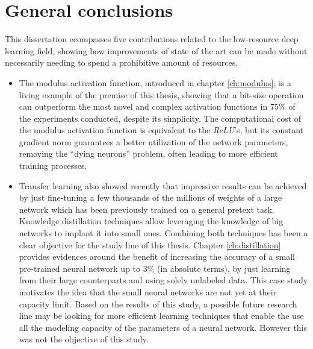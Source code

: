 \chapter{General conclusions} \label{ch:conclusions}
This dissertation ecompasses five contributions related to the low-resource deep learning field, showing how improvements of state of the art can be made without necessarily needing to spend a prohibitive amount of resources. 

\begin{itemize}
\item The modulus activation function, introduced in chapter \ref{ch:modulus}, is a living example of the premise of this thesis, showing that a bit-size operation can outperform the most novel and complex activation functions in 75\% of the experiments conducted, despite its simplicity. The computational cost of the modulus activation function is equivalent to the \textit{ReLU}'s, but its constant gradient norm guarantees a better utilization of the network parameters, removing the ``dying neurons'' problem, often leading to more efficient training processes.

\item Transfer learning also showed recently that impressive results can be achieved by just fine-tuning a few thousands of the millions of weights of a large network which has been previously trained on a general pretext task. Knowledge distillation techniques allow leveraging the knowledge of big networks to implant it into small ones. Combining both techniques has been a clear objective for the study line of this thesis. Chapter \ref{ch:distillation} provides evidences around the benefit of increasing the accuracy of a small pre-trained neural network up to 3\% (in absolute terms), by just learning from their large counterparts and using solely unlabeled data. This case study motivates the idea that the small neural networks are not yet at their capacity limit. Based on the results of this study, a possible future research line may be looking for more efficient learning techniques that enable the use all the modeling capacity of the parameters of a neural network. However this was not the objective of this study.


\end{itemize}
